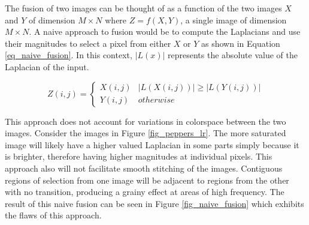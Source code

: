 \documentclass[sigconf]{acmart/acmart}
\begin{document}
The fusion of two images can be thought of as a function of the two images $X$ and $Y$ of dimension $M \times N$ where $Z = f(X, Y)$, a single image of dimension $M \times N$. A naive approach to fusion would be to compute the Laplacians and use their magnitudes to select a pixel from either $X$ or $Y$ as shown in Equation \ref{eq_naive_fusion}. In this context, $|L(x)|$ represents the absolute value of the Laplacian of the input.

\begin{equation}
Z(i,j)=
\begin{cases}
X(i,j) & |L(X(i,j))| \ge |L(Y(i,j))| \\
Y(i,j) & otherwise
\end{cases}
\label{eq_naive_fusion}
\end{equation}

This approach does not account for variations in colorspace between the two images. Consider the images in Figure \ref{fig_peppers_lr}. The more saturated image will likely have a higher valued Laplacian in some parts simply because it is brighter, therefore having higher magnitudes at individual pixels. This approach also will not facilitate smooth stitching of the images. Contiguous regions of selection from one image will be adjacent to regions from the other with no transition, producing a grainy effect at areas of high frequency. The result of this naive fusion can be seen in Figure \ref{fig_naive_fusion} which exhibits the flaws of this approach.
\end{document}
